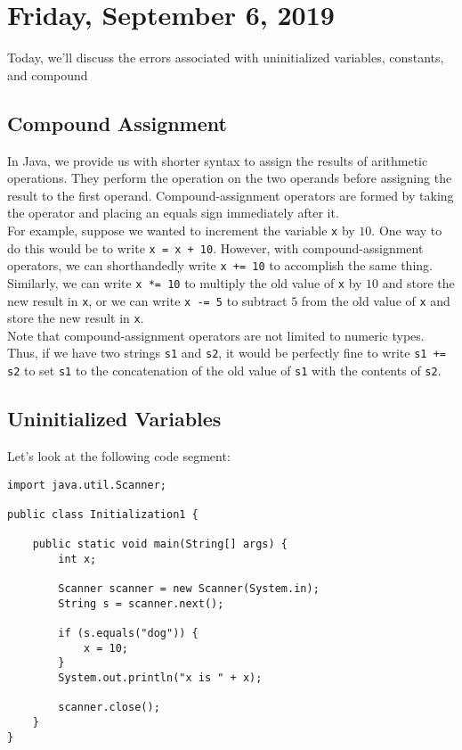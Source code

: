\section{Friday, September 6, 2019}

Today, we'll discuss the errors associated with uninitialized variables, constants, and compound  

\subsection{Compound Assignment}

In Java, we  provide us with shorter syntax to assign the results of arithmetic operations. They perform the operation on the two operands before assigning the result to the first operand. Compound-assignment operators are formed by taking the operator and placing an equals sign immediately after it. \\

For example, suppose we wanted to increment the variable \verb!x! by $10$. One way to do this would be to write \verb!x = x + 10!. However, with compound-assignment operators, we can shorthandedly write \verb!x += 10! to accomplish the same thing. Similarly, we can write \verb!x *= 10! to multiply the old value of \verb!x! by $10$ and store the new result in \verb!x!, or we can write \verb!x -= 5! to subtract $5$ from the old value of \verb!x! and store the new result in \verb!x!. \\

Note that compound-assignment operators are not limited to numeric types. Thus, if we have two strings \verb!s1! and \verb!s2!, it would be perfectly fine to write \verb!s1 += s2! to set \verb!s1! to the concatenation of the old value of \verb!s1! with the contents of \verb!s2!. 

\subsection{Uninitialized Variables}

Let's look at the following code segment:

\begin{lstlisting}
import java.util.Scanner;

public class Initialization1 {

	public static void main(String[] args) {
		int x;
		
		Scanner scanner = new Scanner(System.in);
		String s = scanner.next();

		if (s.equals("dog")) {
			x = 10;
		}
		System.out.println("x is " + x);
		
		scanner.close();
	}
}
\end{lstlisting}

